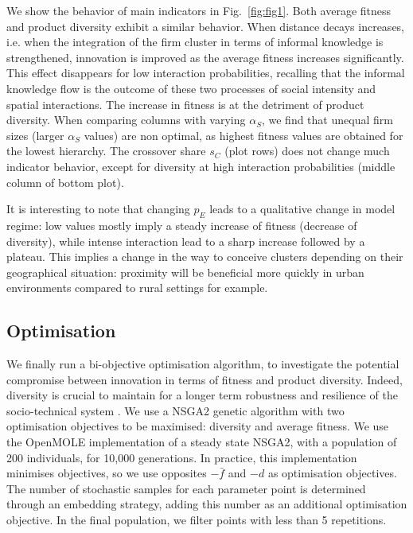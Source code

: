 \documentclass[letterpaper]{article}
\begin{document}
We show the behavior of main indicators in Fig.~\ref{fig:fig1}. Both average fitness and product diversity exhibit a similar behavior. When distance decays increases, i.e. when the integration of the firm cluster in terms of informal knowledge is strengthened, innovation is improved as the average fitness increases significantly. This effect disappears for low interaction probabilities, recalling that the informal knowledge flow is the outcome of these two processes of social intensity and spatial interactions. The increase in fitness is at the detriment of product diversity. When comparing columns with varying $\alpha_S$, we find that unequal firm sizes (larger $\alpha_S$ values) are non optimal, as highest fitness values are obtained for the lowest hierarchy. The crossover share $s_C$ (plot rows) does not change much indicator behavior, except for diversity at high interaction probabilities (middle column of bottom plot).

It is interesting to note that changing $p_E$ leads to a qualitative change in model regime: low values mostly imply a steady increase of fitness (decrease of diversity), while intense interaction lead to a sharp increase followed by a plateau. This implies a change in the way to conceive clusters depending on their geographical situation: proximity will be beneficial more quickly in urban environments compared to rural settings for example.




\subsection{Optimisation}

We finally run a bi-objective optimisation algorithm, to investigate the potential compromise between innovation in terms of fitness and product diversity. Indeed, diversity is crucial to maintain for a longer term robustness and resilience of the socio-technical system \citep{reinmoeller2005link}. We use a NSGA2 genetic algorithm with two optimisation objectives to be maximised: diversity and average fitness. We use the OpenMOLE implementation of a steady state NSGA2, with a population of 200 individuals, for 10,000 generations. In practice, this implementation minimises objectives, so we use opposites $- \bar{f}$ and $-d$ as optimisation objectives. The number of stochastic samples for each parameter point is determined through an embedding strategy, adding this number as an additional optimisation objective. In the final population, we filter points with less than 5 repetitions.
\end{document}
